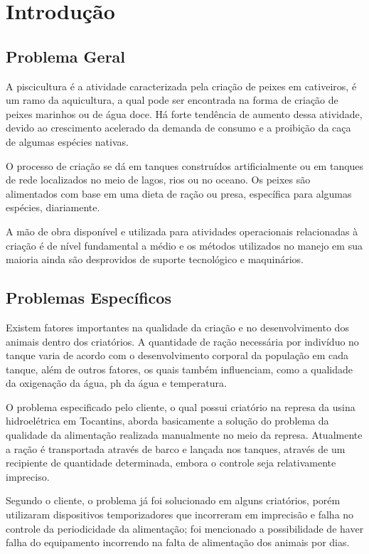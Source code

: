 \chapter[Introdução]{Introdução}\label{cap1}

\section{Problema Geral}
A piscicultura é a atividade caracterizada pela criação de peixes em cativeiros, é um ramo da aquicultura, a qual pode ser encontrada na forma de criação de peixes marinhos ou de água doce. Há forte tendência de aumento dessa atividade, devido ao crescimento acelerado da demanda de consumo e a proibição da caça de algumas espécies nativas.

O processo de criação se dá em tanques construídos artificialmente ou em tanques de rede localizados no meio de lagos, rios ou no oceano. Os peixes são alimentados com base em uma dieta de ração ou presa, específica para algumas espécies, diariamente.

A mão de obra disponível e utilizada para atividades operacionais relacionadas à criação é de nível fundamental a médio e os métodos utilizados no manejo em sua maioria ainda são desprovidos de suporte tecnológico e maquinários.

\section{Problemas Específicos}

Existem fatores importantes na qualidade da criação e no desenvolvimento dos animais dentro dos criatórios. A quantidade de ração necessária por indivíduo no tanque varia de acordo com o desenvolvimento corporal da população em cada tanque, além de outros fatores, os quais também influenciam,  como a qualidade da oxigenação da água, ph da água e temperatura.

O problema especificado pelo cliente, o qual possui criatório na represa da usina hidroelétrica em Tocantins, aborda basicamente a solução do problema da qualidade da alimentação realizada manualmente no meio da represa. Atualmente a ração é transportada através de barco e lançada nos tanques, através de um recipiente de quantidade determinada, embora o controle seja relativamente impreciso.

Segundo o cliente, o problema já foi solucionado em alguns criatórios, porém utilizaram dispositivos temporizadores que incorreram em imprecisão e falha no controle da periodicidade da alimentação; foi mencionado a possibilidade de haver falha do equipamento incorrendo na falta de alimentação dos animais por dias.

